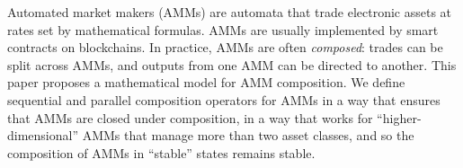 Automated market makers (AMMs) are automata that trade electronic assets at rates set by mathematical formulas. AMMs are usually implemented by smart contracts on blockchains.
In practice,
AMMs are often \emph{composed}:
trades can be split across AMMs,
and outputs from one AMM can be directed to another.
This paper proposes a mathematical model for AMM composition.
We define sequential and parallel composition operators for AMMs
in a way that ensures that AMMs are closed under composition,
in a way that works for ``higher-dimensional'' AMMs that
manage more than two asset classes, and so the composition
of AMMs in ``stable'' states remains stable.

